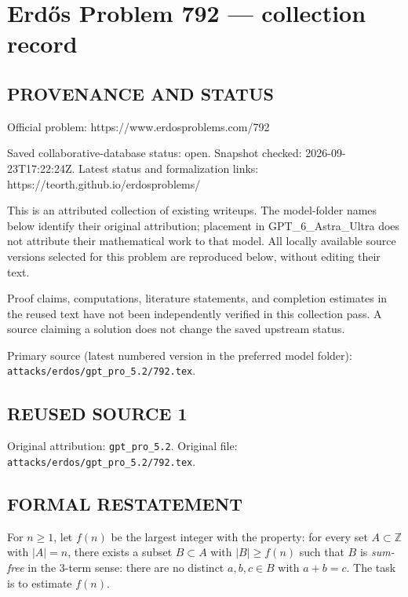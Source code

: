 \section*{Erd\H{o}s Problem 792 --- collection record}

\subsection*{PROVENANCE AND STATUS}
Official problem: https://www.erdosproblems.com/792

Saved collaborative-database status: open.
Snapshot checked: 2026-09-23T17:22:24Z.
Latest status and formalization links: https://teorth.github.io/erdosproblems/

This is an attributed collection of existing writeups. The model-folder names below identify their original attribution; placement in GPT\_6\_Astra\_Ultra does not attribute their mathematical work to that model. All locally available source versions selected for this problem are reproduced below, without editing their text.

Proof claims, computations, literature statements, and completion estimates in the reused text have not been independently verified in this collection pass. A source claiming a solution does not change the saved upstream status.

Primary source (latest numbered version in the preferred model folder): \texttt{attacks/erdos/gpt\_pro\_5.2/792.tex}.

\subsection*{REUSED SOURCE 1}
Original attribution: \texttt{gpt\_pro\_5.2}.
Original file: \texttt{attacks/erdos/gpt\_pro\_5.2/792.tex}.


\subsection*{FORMAL RESTATEMENT}
For $n\ge 1$, let $f(n)$ be the largest integer with the property:
for every set $A\subset\mathbb Z$ with $|A|=n$, there exists a subset $B\subset A$ with $|B|\ge f(n)$ such that $B$ is \emph{sum-free} in the 3-term sense:
there are no distinct $a,b,c\in B$ with $a+b=c$.
The task is to estimate $f(n)$.

